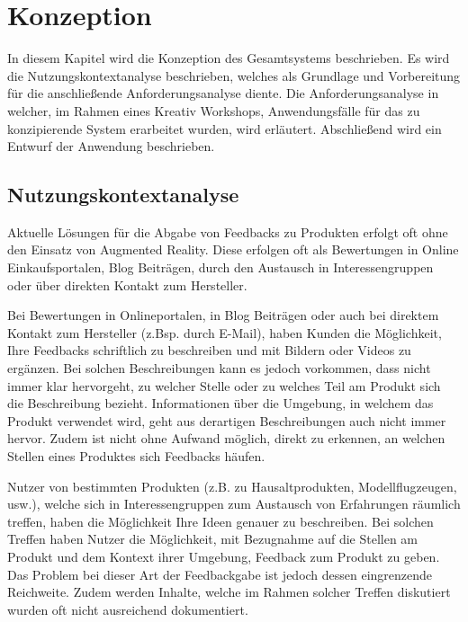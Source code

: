 \chapter{Konzeption}\label{conception_chapter}

In diesem Kapitel wird die Konzeption des Gesamtsystems beschrieben. Es wird die Nutzungskontextanalyse beschrieben, welches als Grundlage und Vorbereitung für die anschließende Anforderungsanalyse diente. Die Anforderungsanalyse in welcher, im Rahmen eines Kreativ Workshops, Anwendungsfälle für das zu konzipierende System erarbeitet wurden, wird erläutert. Abschließend wird ein Entwurf der Anwendung beschrieben.

\section{Nutzungskontextanalyse}

Aktuelle Lösungen für die Abgabe von Feedbacks zu Produkten erfolgt oft ohne den Einsatz von Augmented Reality. Diese erfolgen 
oft als Bewertungen in Online Einkaufsportalen, Blog Beiträgen, durch den Austausch in Interessengruppen oder über direkten Kontakt zum Hersteller.

Bei Bewertungen in Onlineportalen, in Blog Beiträgen oder auch bei direktem Kontakt zum Hersteller (z.Bsp. durch E-Mail), haben Kunden die Möglichkeit, 
Ihre Feedbacks schriftlich zu beschreiben und mit Bildern oder Videos zu ergänzen. Bei solchen Beschreibungen kann es jedoch vorkommen, dass 
nicht immer klar hervorgeht, zu welcher Stelle oder zu welches Teil am Produkt sich die Beschreibung bezieht. Informationen über die Umgebung, in welchem das Produkt 
verwendet wird, geht aus derartigen Beschreibungen auch nicht immer hervor. Zudem ist nicht ohne Aufwand möglich, direkt zu erkennen, an welchen Stellen eines Produktes sich
Feedbacks häufen.

Nutzer von bestimmten Produkten (z.B. zu Hausaltprodukten, Modellflugzeugen, usw.), welche sich in Interessengruppen zum Austausch von Erfahrungen räumlich treffen, 
haben die Möglichkeit Ihre Ideen genauer zu beschreiben. 
Bei solchen Treffen haben Nutzer die Möglichkeit, mit Bezugnahme auf die Stellen am Produkt und dem Kontext ihrer Umgebung, Feedback zum Produkt zu geben. 
Das Problem bei dieser Art der Feedbackgabe ist jedoch dessen eingrenzende Reichweite. Zudem werden Inhalte, welche im Rahmen solcher Treffen diskutiert wurden oft nicht ausreichend dokumentiert.  

